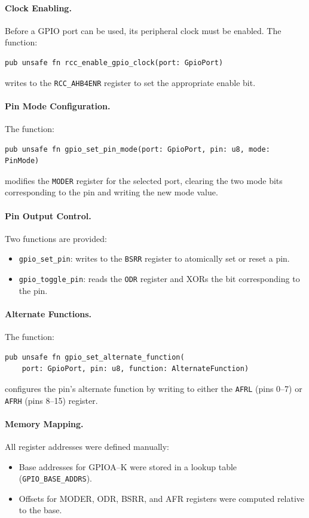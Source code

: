 \documentclass[12pt,a4paper]{article}
\begin{document}
\paragraph{Clock Enabling.}
Before a GPIO port can be used, its peripheral clock must be enabled.  
The function:
\begin{verbatim}
pub unsafe fn rcc_enable_gpio_clock(port: GpioPort)
\end{verbatim}
writes to the \texttt{RCC\_AHB4ENR} register to set the appropriate enable bit.

\paragraph{Pin Mode Configuration.}
The function:
\begin{verbatim}
pub unsafe fn gpio_set_pin_mode(port: GpioPort, pin: u8, mode: PinMode)
\end{verbatim}
modifies the \texttt{MODER} register for the selected port, clearing the 
two mode bits corresponding to the pin and writing the new mode value.

\paragraph{Pin Output Control.}
Two functions are provided:
\begin{itemize}
    \item \texttt{gpio\_set\_pin}: writes to the \texttt{BSRR} register to atomically set or reset a pin.
    \item \texttt{gpio\_toggle\_pin}: reads the \texttt{ODR} register and XORs the bit corresponding to the pin.
\end{itemize}

\paragraph{Alternate Functions.}
The function:
\begin{verbatim}
pub unsafe fn gpio_set_alternate_function(
    port: GpioPort, pin: u8, function: AlternateFunction)
\end{verbatim}
configures the pin’s alternate function by writing to either the 
\texttt{AFRL} (pins 0--7) or \texttt{AFRH} (pins 8--15) register. 

\paragraph{Memory Mapping.}
All register addresses were defined manually:
\begin{itemize}
    \item Base addresses for GPIOA--K were stored in a lookup table (\texttt{GPIO\_BASE\_ADDRS}).
    \item Offsets for MODER, ODR, BSRR, and AFR registers were computed relative to the base.
\end{itemize}
\end{document}
